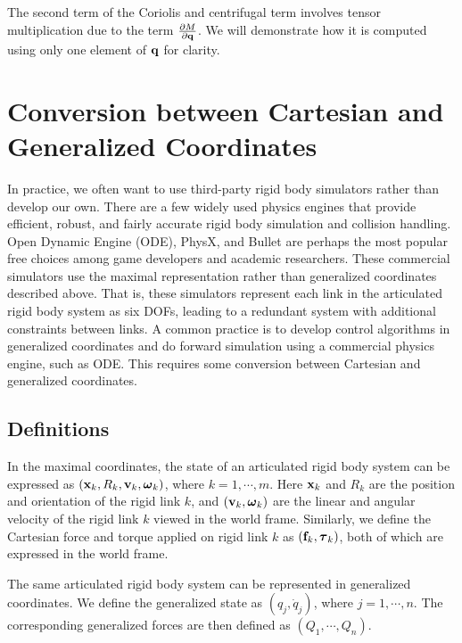 The second term of the Coriolis and centrifugal term involves tensor
multiplication due to the term $\frac{\partial M}{\partial
  \mathbf{q}}$. We will demonstrate how it is computed using only one
element of $\mathbf{q}$ for clarity. 


\section{Conversion between Cartesian and Generalized Coordinates}
In practice, we often want to use third-party rigid body simulators
rather than develop our own. There are a few widely used physics
engines that provide efficient, robust, and fairly accurate rigid body
simulation and collision handling. Open Dynamic Engine (ODE), PhysX, and
Bullet are perhaps the most popular free choices among game developers and
academic researchers. These commercial simulators use the maximal
representation rather than generalized coordinates
described above. That is, these simulators represent each link in the
articulated rigid body system as six DOFs,
leading to a redundant system with additional constraints between
links. A common practice is to develop control algorithms in
generalized coordinates and do forward simulation using a commercial
physics engine, such as ODE. This requires some conversion between
Cartesian and generalized coordinates.

\subsection{Definitions}
In the maximal coordinates, the state of an articulated rigid body
system can be expressed as $(\mathbf{x}_k, R_k, \mathbf{v}_k,
\boldsymbol{\omega}_k)$, where $k = 1, \cdots, m$. Here $\mathbf{x}_k$ and
$R_k$ are the position and orientation of the rigid link $k$, and $(\mathbf{v}_k,
\boldsymbol{\omega}_k)$ are the linear and angular velocity of the
rigid link $k$ viewed in the world frame. Similarly, we define the
Cartesian force and torque applied on rigid link $k$ as $(\mathbf{f}_k,
\boldsymbol{\tau}_k)$, both of which are expressed in the world
frame.

The same articulated rigid body system can be represented in
generalized coordinates. We define the generalized state as $(q_j,
\dot{q}_j)$, where $j = 1, \cdots, n$. The corresponding generalized
forces are then defined as $(Q_1, \cdots, Q_n)$.

